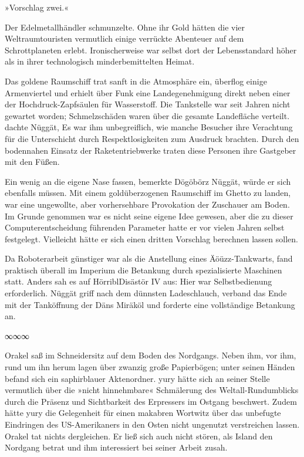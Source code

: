 »Vorschlag zwei.«


Der Edelmetallhändler schmunzelte. Ohne ihr Gold hätten die vier Weltraumtouristen vermutlich einige verrückte Abenteuer auf dem Schrottplaneten erlebt. Ironischerweise war selbst dort der Lebensstandard höher als in ihrer technologisch minderbemittelten Heimat.

Das goldene Raumschiff trat sanft in die Atmosphäre ein, überflog einige Armenviertel und erhielt über Funk eine Landegenehmigung direkt neben einer der Hochdruck-Zapfsäulen für Wasserstoff. Die Tankstelle war seit Jahren nicht gewartet worden; Schmelzschäden waren über die gesamte Landefläche verteilt.  dachte Nüggät,  Es war ihm unbegreiflich, wie manche Besucher ihre Verachtung für die Unterschicht durch Respektlosigkeiten zum Ausdruck brachten. Durch den bodennahen Einsatz der Raketentriebwerke traten diese Personen ihre Gastgeber mit den Füßen.

Ein wenig an die eigene Nase fassen, bemerkte Dögöbörz Nüggät, würde er sich ebenfalls müssen. Mit einem goldüberzogenen Raumschiff im Ghetto zu landen, war eine ungewollte, aber vorhersehbare Provokation der Zuschauer am Boden. Im Grunde genommen war es nicht seine eigene Idee gewesen, aber die zu dieser Computerentscheidung führenden Parameter hatte er vor vielen Jahren selbst festgelegt. Vielleicht hätte er sich einen dritten Vorschlag berechnen lassen sollen.

Da Roboterarbeit günstiger war als die Anstellung eines Äöüzz-Tankwarts, fand praktisch überall im Imperium die Betankung durch spezialisierte Maschinen statt. Anders sah es auf HörriblDisästör IV aus: Hier war Selbstbedienung erforderlich. Nüggät griff nach dem dünnsten Ladeschlauch, verband das Ende mit der Tanköffnung der Däns Miräköl und forderte eine vollständige Betankung an.

\begin{center}
∞∞∞
\end{center}

Orakel saß im Schneidersitz auf dem Boden des Nordgangs. Neben ihm, vor ihm, rund um ihn herum lagen über zwanzig große Papierbögen; unter seinen Händen befand sich ein saphirblauer Aktenordner. yury hätte sich an seiner Stelle vermutlich über die »nicht hinnehmbare« Schmälerung des Weltall-Rundumblicks durch die Präsenz und Sichtbarkeit des Erpressers im Ostgang beschwert. Zudem hätte yury die Gelegenheit für einen makabren Wortwitz über das unbefugte Eindringen des US-Amerikaners in den Osten nicht ungenutzt verstreichen lassen. Orakel tat nichts dergleichen. Er ließ sich auch nicht stören, als Island den Nordgang betrat und ihm interessiert bei seiner Arbeit zusah.

